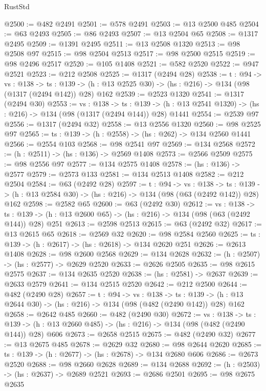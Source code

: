 \begin{lexlean}{RustStd}
\begin{coremodule}
@2500 := @482 @2491
@2501 := @578 @2491
@2503 := @13 @2500 @485
@2504 := @63 @2493
@2505 := @86 @2493
@2507 := @13 @2504 @65
@2508 := @1317 @2495
@2509 := @1391 @2495
@2511 := @13 @2508 @1320
@2513 := @98 @2508 @97
@2515 := @98 @2504 @2513
@2517 := @98 @2500 @2515
@2519 := @98 @2496 @2517
@2520 := @105 @1408
@2521 := @582 @2520
@2522 := @947 @2521
@2523 := @212 @2508
@2525 := @1317 (@2494 @28)
@2538 := {t : @94} ->
  {vs : @138} ->
  {ts : @139} -> (h : @13 @2525 @30) -> (hs : @216) -> @134 (@98 (@1317 (@2494 @142)) @28) @162
@2539 := @2523 @1320
@2541 := @1317 (@2494 @30)
@2553 := {vs : @138} ->
  {ts : @139} -> (h : @13 @2541 @1320) -> (hs : @216) -> @134 (@98 (@1317 (@2494 @144)) @28) @1441
@2554 := @2539 @97
@2556 := @1317 (@2494 @32)
@2558 := @13 @2556 @1320
@2560 := @98 @2525 @97
@2565 := {ts : @139} -> (h : @2558) -> (hs : @262) -> @134 @2560 @1441
@2566 := @2554 @103
@2568 := @98 @2541 @97
@2569 := @134 @2568
@2572 := (h : @2511) -> (hs : @136) -> @2569 @1408
@2573 := @2566 @2509
@2575 := @98 @2556 @97
@2577 := @134 @2575 @1408
@2578 := (hs : @136) -> @2577
@2579 := @2573 @133
@2581 := @134 @2513 @1408
@2582 := @212 @2504
@2584 := @63 (@2492 @28)
@2597 := {t : @94} ->
  {vs : @138} ->
  {ts : @139} -> (h : @13 @2584 @30) -> (hs : @216) -> @134 (@98 (@63 (@2492 @142)) @28) @162
@2598 := @2582 @65
@2600 := @63 (@2492 @30)
@2612 := {vs : @138} ->
  {ts : @139} -> (h : @13 @2600 @65) -> (hs : @216) -> @134 (@98 (@63 (@2492 @144)) @28) @251
@2613 := @2598 @2513
@2615 := @63 (@2492 @32)
@2617 := @13 @2615 @65
@2618 := @2569 @32
@2620 := @98 @2584 @2560
@2625 := {ts : @139} -> (h : @2617) -> (hs : @2618) -> @134 @2620 @251
@2626 := @2613 @1408
@2628 := @98 @2600 @2568
@2629 := @134 @2628
@2632 := (h : @2507) -> (hs : @2577) -> @2629 @2520
@2633 := @2626 @2505
@2635 := @98 @2615 @2575
@2637 := @134 @2635 @2520
@2638 := (hs : @2581) -> @2637
@2639 := @2633 @2579
@2641 := @134 @2515 @2520
@2642 := @212 @2500
@2644 := @482 (@2490 @28)
@2657 := {t : @94} ->
  {vs : @138} ->
  {ts : @139} -> (h : @13 @2644 @30) -> (hs : @216) -> @134 (@98 (@482 (@2490 @142)) @28) @162
@2658 := @2642 @485
@2660 := @482 (@2490 @30)
@2672 := {vs : @138} ->
  {ts : @139} -> (h : @13 @2660 @485) -> (hs : @216) -> @134 (@98 (@482 (@2490 @144)) @28) @606
@2673 := @2658 @2515
@2675 := @482 (@2490 @32)
@2677 := @13 @2675 @485
@2678 := @2629 @32
@2680 := @98 @2644 @2620
@2685 := {ts : @139} -> (h : @2677) -> (hs : @2678) -> @134 @2680 @606
@2686 := @2673 @2520
@2688 := @98 @2660 @2628
@2689 := @134 @2688
@2692 := (h : @2503) -> (hs : @2637) -> @2689 @2521
@2693 := @2686 @2501
@2695 := @98 @2675 @2635

\end{coremodule}
\end{lexlean}
